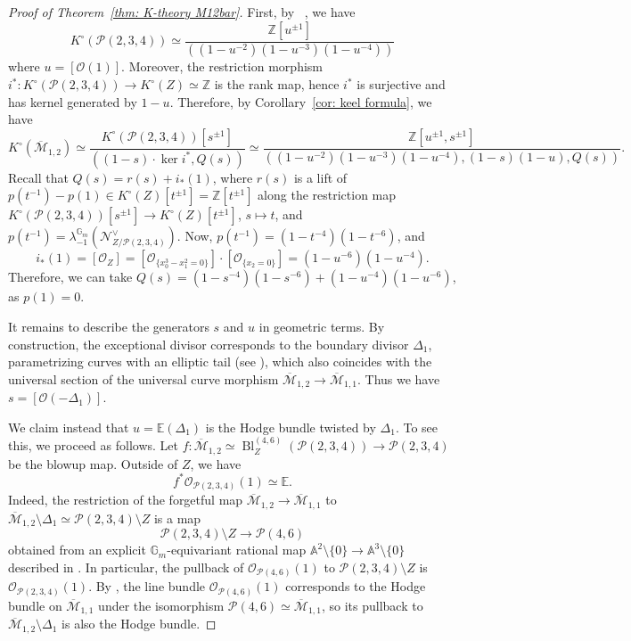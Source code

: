 \documentclass[12pt]{amsart}
\newcommand\Gm{\mathbb{G}_m}
\newcommand\Z{\mathbb{Z}}
\newcommand{\sN}{\mathscr{N}}
\newcommand{\sO}{\mathscr{O}}
\newcommand{\cM}{\mathcal{M}}
\newcommand{\cP}{\mathcal{P}}
\newcommand{\Kring}{K^{\circ}}
\theoremstyle{definition}
\begin{document}
\begin{proof}[Proof of Theorem~\ref{thm: K-theory M12bar}]
    First, by ~, we have
    \[
        \Kring(\cP(2,3,4))\simeq\frac{\Z[u^{\pm1}]}{((1-u^{-2})(1-u^{-3})(1-u^{-4}))}
    \]
    where $u=[\sO(1)]$. Moreover, the restriction morphism $i^*:\Kring(\cP(2,3,4))\rightarrow\Kring(Z)\simeq\Z$ is the rank map, hence $i^*$ is surjective and has kernel generated by $1-u$. Therefore, by Corollary~\ref{cor: keel formula}, we have
    \[
        \Kring(\overline{\cM}_{1,2})\simeq\frac{\Kring(\cP(2,3,4))[s^{\pm1}]}{((1-s)\cdot\ker i^*,Q(s))}\simeq\frac{\Z[u^{\pm1},s^{\pm1}]}{((1-u^{-2})(1-u^{-3})(1-u^{-4}),(1-s)(1-u),Q(s))}.
    \]
    Recall that $Q(s)=r(s)+i_*(1)$, where $r(s)$ is a lift of $p(t^{-1})-p(1)\in\Kring(Z)[t^{\pm1}]=\Z[t^{\pm1}]$ along the restriction map $\Kring(\cP(2,3,4))[s^{\pm1}]\rightarrow\Kring(Z)[t^{\pm1}]$, $s\mapsto t$, and $p(t^{-1})=\lambda_{-1}^{\Gm}(\sN_{Z/\cP(2,3,4)}^{\vee})$. Now, $p(t^{-1})=(1-t^{-4})(1-t^{-6})$, and
    \[
        i_*(1)=[\sO_Z]=[\sO_{\{x_0^3-x_1^2=0\}}]\cdot[\sO_{\{x_2=0\}}]=(1-u^{-6})(1-u^{-4}).
    \]
    Therefore, we can take $Q(s)=(1-s^{-4})(1-s^{-6})+(1-u^{-4})(1-u^{-6})$, as $p(1)=0$.

    It remains to describe the generators $s$ and $u$ in geometric terms. By construction, the exceptional divisor corresponds to the boundary divisor $
    \Delta_1$, parametrizing curves with an elliptic tail (see \cite[Theorem 2.10]{Inchiostro}), which also coincides with the universal section of the universal curve morphism $\overline{\cM}_{1,2} \rightarrow \overline{\cM}_{1,1}$. Thus we have $s=[\sO(-\Delta_1)]$. 

    We claim instead that $u = \mathbb{E}(\Delta_1)$ is the Hodge bundle twisted by $\Delta_1$. To see this, we proceed as follows. Let $f \colon \overline{\mathcal{M}}_{1,2} \simeq \operatorname{Bl}_{Z}^{(4,6)}(\mathcal{P}(2,3,4)) \to \mathcal{P}(2,3,4)$ be the blowup map. Outside of $Z$, we have
\[
f^* \mathcal{O}_{\cP(2,3,4)}(1) \simeq \mathbb{E}.
\]
Indeed, the restriction of the forgetful map $\overline{\mathcal{M}}_{1,2} \to \overline{\mathcal{M}}_{1,1}$ to $\overline{\mathcal{M}}_{1,2} \setminus \Delta_1 \simeq \mathcal{P}(2,3,4) \setminus Z$ is a map
\[
\mathcal{P}(2,3,4) \setminus Z \to \mathcal{P}(4,6)
\]
obtained from an explicit $\mathbb{G}_m$-equivariant rational map $\mathbb{A}^2 \setminus \{0\} \to \mathbb{A}^3 \setminus \{0\}$ described in \cite[Section 2.1]{Inchiostro}. In particular, the pullback of $\mathcal{O}_{\mathcal{P}(4,6)}(1)$ to $\mathcal{P}(2,3,4) \setminus Z$ is $\mathcal{O}_{\mathcal{P}(2,3,4)}(1)$. By , the line bundle $\mathcal{O}_{\mathcal{P}(4,6)}(1)$ corresponds to the Hodge bundle on $\overline{\mathcal{M}}_{1,1}$ under the isomorphism $\mathcal{P}(4,6) \simeq \overline{\mathcal{M}}_{1,1}$, so its pullback to $\overline{\mathcal{M}}_{1,2} \setminus \Delta_1$ is also the Hodge bundle.


\end{proof}
\end{document}
